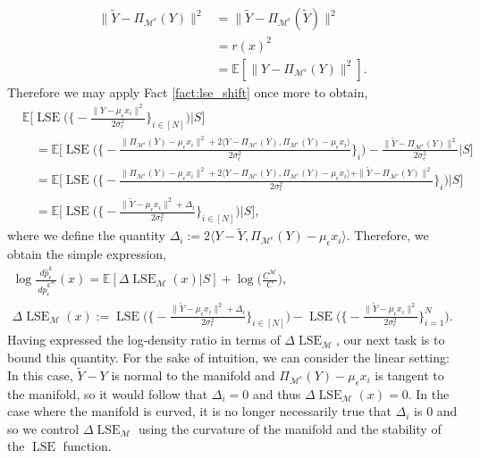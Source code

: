 \documentclass[10pt]{article}
\theoremstyle{plain}
\theoremstyle{definition}
\theoremstyle{remark}
\newcommand{\M}{{\mathcal{M}}}
\newcommand{\lse}{\operatorname{LSE}}
\newcommand{\E}{\mathbb{E}}
\newcommand{\Pieps}{\Pi_{\M^\epsilon}}
\begin{document}
\begin{align*}
    \|\tilde{Y} - \Pieps(Y)\|^2 &= \|\tilde{Y} - \Pieps(\tilde{Y})\|^2 \\
    &= r(x)^2\\
    &= \E[\|Y - \Pieps(Y)\|^2].
\end{align*}
Therefore we may apply Fact \ref{fact:lse_shift} once more to obtain,
\begin{align*}
    &\E \bigg [ \lse \bigg ( \bigg \{ -\frac{\|Y - \mu_\epsilon x_i\|^2}{2 \sigma_\epsilon^2} \bigg\}_{i \in [N]} \bigg ) \bigg | S \bigg ] \\
    & \quad = \E \bigg [ \lse \bigg ( \bigg \{ -\frac{\|\Pieps(Y) - \mu_\epsilon x_i\|^2 + 2\langle Y - \Pieps(Y), \Pieps(Y) - \mu_\epsilon x_i \rangle}{2 \sigma_\epsilon^2} \bigg\}_{i} \bigg ) - \frac{\|\tilde{Y} - \Pieps(Y)\|^2}{2 \sigma_\epsilon^2} \bigg | S \bigg ] \\
    & \quad = \E \bigg [ \lse \bigg ( \bigg \{ -\frac{\|\Pieps(Y) - \mu_\epsilon x_i\|^2 + 2\langle Y - \Pieps(Y), \Pieps(Y) - \mu_\epsilon x_i \rangle + \|\tilde{Y} - \Pieps(Y)\|^2}{2 \sigma_\epsilon^2} \bigg\}_{i} \bigg ) \bigg | S \bigg ] \\
    & \quad = \E \bigg [ \lse \bigg ( \bigg \{ -\frac{\|\tilde{Y} - \mu_\epsilon x_i\|^2 + \Delta_i}{2 \sigma_\epsilon^2} \bigg\}_{i \in [N]} \bigg ) \bigg | S \bigg ],
\end{align*}
where we define the quantity \(\Delta_i := 2\langle Y - \tilde{Y}, \Pieps(Y) - \mu_\epsilon x_i \rangle\). Therefore, we obtain the simple expression,
\begin{gather}
    \log {\frac{d\hat{p}^k_\epsilon}{\ d\hat{p}^{k^\M}_\epsilon}}(x) = \E[\Delta \lse_\M(x)|S] + \log \bigg ( \frac{C^\M}{C} \bigg ),\label{eq:density_ratio_delta_2}\\
    \Delta \lse_\M(x) := \lse \bigg ( \bigg \{ -\frac{\|\tilde{Y} - \mu_\epsilon x_i\|^2 + \Delta_i}{2 \sigma_\epsilon^2} \bigg\}_{i \in [N]} \bigg ) - \lse \bigg ( \bigg \{ -\frac{\|\tilde{Y} - \mu_\epsilon x_i\|^2}{2 \sigma_\epsilon^2} \bigg\}_{i=1}^N \bigg ).\nonumber
\end{gather}
Having expressed the log-density ratio in terms of \(\Delta \lse_\M\), our next task is to bound this quantity. For the sake of intuition, we can consider the linear setting: In this case, \(\tilde{Y}-Y\) is normal to the manifold and \(\Pieps(Y) - \mu_\epsilon x_i\) is tangent to the manifold, so it would follow that \(\Delta_i = 0\) and thus \(\Delta \lse_\M (x) = 0\). In the case where the manifold is curved, it is no longer necessarily true that \(\Delta_i\) is \(0\) and so we control \(\Delta \lse_\M\) using the curvature of the manifold and the stability of the \(\lse\) function.
\end{document}

